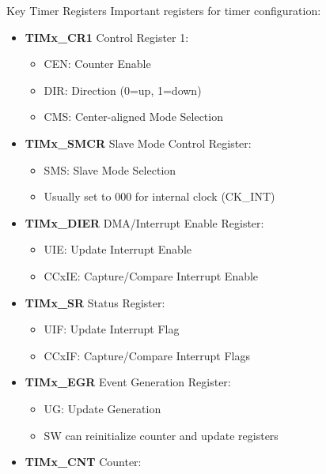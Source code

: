 \begin{corollary}{Key Timer Registers}
Important registers for timer configuration:

\begin{minipage}{0.5\linewidth}
\begin{itemize}
    \item \textbf{TIMx\_CR1} Control Register 1:
    \begin{itemize}
        \item CEN: Counter Enable
        \item DIR: Direction (0=up, 1=down)
        \item CMS: Center-aligned Mode Selection
    \end{itemize}
    \item \textbf{TIMx\_SMCR} Slave Mode Control Register:
    \begin{itemize}
        \item SMS: Slave Mode Selection
        \item Usually set to 000 for internal clock (CK\_INT)
    \end{itemize}
    \item \textbf{TIMx\_DIER} DMA/Interrupt Enable Register:
    \begin{itemize}
        \item UIE: Update Interrupt Enable
        \item CCxIE: Capture/Compare Interrupt Enable
    \end{itemize}
    \item \textbf{TIMx\_SR} Status Register:
    \begin{itemize}
        \item UIF: Update Interrupt Flag
        \item CCxIF: Capture/Compare Interrupt Flags
    \end{itemize}
\end{itemize}
\end{minipage}
\begin{minipage}{0.5\linewidth}
\begin{itemize}
    \item \textbf{TIMx\_EGR} Event Generation Register:
    \begin{itemize}
        \item UG: Update Generation
        \item SW can reinitialize counter and update registers
    \end{itemize}
    \item \textbf{TIMx\_CNT} Counter:

\end{itemize}
\end{minipage}
\end{corollary}
